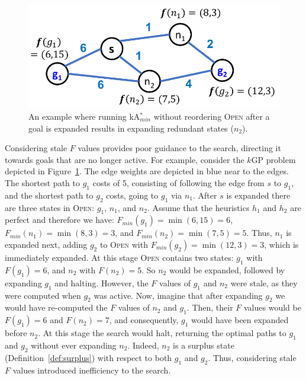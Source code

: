 \documentclass{aicom2e}
\newcommand{\kgs}{$k$GP}
\newcommand{\kastarmin}{kA$^*_{min}$}
\newcommand{\open}{\textsc{Open}}
\begin{document}


\begin{figure}
    \includegraphics[width=0.9\columnwidth]{need-resort_cropped.pdf}
    \caption{An example where running \kastarmin{} without reordering \open{} after a goal is expanded
        results in expanding redundant states ($n_2$).}
    \label{fig:need-resort}
\end{figure}


Considering stale $F$ values provides poor guidance to the search, directing it
towards goals that are no longer active. For example, consider the \kgs{}
problem depicted in Figure~\ref{fig:need-resort}. The edge weights are depicted
in blue near to the edges. The shortest path to $g_1$ costs of 5, consisting of
following the edge from $s$ to $g_1$, and the shortest path to $g_2$ costs,
going to $g_1$ via $n_1$. After $s$ is expanded there are three states in
\open{}: $g_1$, $n_1$, and $n_2$. Assume that the heuristics $h_1$ and $h_2$
are perfect and therefore we have: $F_{min}(g_1)=\min (6,15)=6$,
$F_{min}(n_1)=\min (8,3)=3$, and $F_{min}(n_2)=\min (7,5)=5$. Thus, $n_1$ is
expanded next, adding $g_2$ to \open{} with $F_{min}(g_2)=\min (12,3)=3$, which
is immediately expanded. At this stage \open{} contains two states: $g_1$ with
$F(g_1)=6$, and $n_2$ with $F(n_2)=5$. So $n_2$ would be expanded, followed by expanding $g_1$ and halting. However, the
$F$ values of $g_1$ and $n_2$ were stale, as they were computed when $g_2$ was
active. Now, imagine that after expanding $g_2$ we
would have re-computed the $F$ values of $n_2$ and $g_1$. Then, their $F$
values would be $F(g_1)=6$ and $F(n_2)=7$, and consequently, $g_1$ would have
been expanded before $n_2$. At this stage the search would halt, returning the
optimal paths to $g_1$ and $g_2$ without ever expanding $n_2$. Indeed, $n_2$ is
a surplus state (Definition~\ref{def:surplus}) with respect to both $g_1$ and
$g_2$. Thus, considering stale $F$ values introduced inefficiency to the
search.
\end{document}
